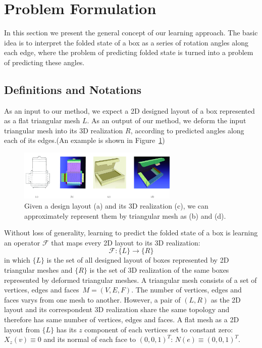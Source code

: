 \section{Problem Formulation}
In this section we present the general concept of our learning approach. The basic idea is to interpret the folded state of a box as a series of rotation angles along each edge, where the problem of predicting folded state is turned into a problem of predicting these angles. 
\subsection{Definitions and Notations}
As an input to our method, we expect a 2D designed layout of a box represented as a flat triangular mesh $L$. As an output of our method, we deform the input triangular mesh into its 3D realization $R$, according to predicted angles along each of its edges.(An example is shown in Figure~\ref{fig:approximation})\\
\begin{figure}
	\centering
	\includegraphics[width=3.0in]{images/approximation.jpg}
	\caption{Given a design layout (a) and its 3D realization (c), we can approximately represent them by triangular mesh as (b) and (d).}
	\label{fig:approximation}
\end{figure}
Without loss of generality, learning to predict the folded state of a box is learning an operator $\mathcal{F}$ that maps every 2D layout to its 3D realization:
\begin{equation}
\mathcal{F}:\{L\}\rightarrow\{R\}
\label{equ:F_0}
\end{equation}
in which $\{L\}$ is the set of all designed layout of boxes represented by 2D triangular meshes and $\{R\}$ is the set of 3D realization of the same boxes represented by deformed triangular meshes. A triangular mesh consists of a set of vertices, edges and faces~$M=(V,E,F)$. The number of vertices, edges and faces varys from one mesh to another. However, a pair of $(L,R)$ as the 2D layout and its correspondent 3D realization share the same topology and therefore has same number of vertices, edges and faces. A flat mesh as a 2D layout from $\{L\}$ has its $z$ component of each vertices set to constant zero: $X_z(v) \equiv 0$ and its normal of each face to $(0,0,1)^T$: $N(e) \equiv (0,0,1)^T$.
